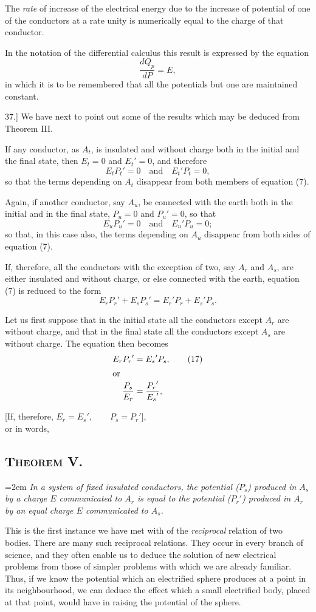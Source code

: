 \documentclass[12pt,oneside]{book}[2021/10/04]
\newcommand{\Heading}{\centering\normalfont}
\newcommand{\Section}[1]{\subsection*{\normalsize\Heading\scshape #1}}
\newcommand{\Runhead}[1]{\fancyhead[C]{\iffloatpage{}{\small#1}}}
\newcommand{\article}[1]{\phantomsection \label{art:#1}{#1.]}}
\newcommand{\hangpara}[1]{\hangindent=2em {\itshape #1} \vspace{1ex}}
\newcommand{\¬}{\hphantom{0}}
\begin{document}
The \textit{rate} of increase of the electrical energy due to the increase
of potential of one of the conductors at a rate unity is numerically
equal to the charge of that conductor.

In the notation of the differential calculus this result is expressed
by the equation
\[\frac{dQ_p}{dP} = E, \tag{14}\]
in which it is to be remembered that all the potentials but one are
maintained constant.

\article{37} We have next to point out some of the results which may
be deduced from Theorem III.
\Runhead{RECIPROCITY OF POTENTIALS.}

If any conductor, as \(A_t\), is insulated and without charge both in
the initial and the final state, then \(E_t = 0\) and \({E_t}' = 0\), and therefore
\[E_t{P_t}' = 0\quad\text{and}\quad {E_t}'P_t = 0, \tag{15}\]
so that the terms depending on \(A_t\) disappear from both members
of equation (7).

Again, if another conductor, say \(A_u\), be connected with the earth
both in the initial and in the final state, \(P_u = 0\) and \({P_u}' = 0\), so that
\[E_u{P_u}' = 0\quad\text{and}\quad {E_u}'P_u = 0;\]
so that, in this case also, the terms depending on \(A_u\) disappear from
both sides of equation (7).

If, therefore, all the conductors with the exception of two, say
\(A_r\) and \(A_s\), are either insulated and without charge, or else connected
with the earth, equation (7) is reduced to the form
\[E_r{P_r}' + E_s{P_s}' = {E_r}'P_r + {E_s}'P_s. \tag{16}\]

Let us first suppose that in the initial state all the conductors
except \(A_r\) are without charge, and that in the final state all the conductors
except \(A_s\) are without charge. The equation then becomes
\begin{align*}
E_r{P_r}' &= {E_s}'P_s, \tag{17}\\
\shortintertext{or}
\frac{P_s}{E_r} &= \frac{{P_r}'}{{E_s}'},
\end{align*}

[If, therefore, \qquad \(E_r = {E_s}', \qquad P_s = {P_r}'\)],\\
or in words,
\Section{Theorem V.}
\hangpara{
In a system of fixed insulated conductors, the potential (\(P_s\)) produced
in \(A_s\) by a charge \(E\) communicated to \(A_r\) is equal to the potential
(\({P_r}'\)) produced in \(A_r\) by an equal charge \(E\) communicated to \(A_s\).}

This is the first instance we have met with of the \textit{reciprocal}
relation of two bodies. There are many such reciprocal relations.
They occur in every branch of science, and they often enable us
to deduce the solution of new electrical problems from those of
simpler problems with which we are already familiar. Thus, if
we know the potential which an electrified sphere produces at a
point in its neighbourhood, we can deduce the effect which a small
electrified body, placed at that point, would have in raising the
potential of the sphere.
\end{document}
